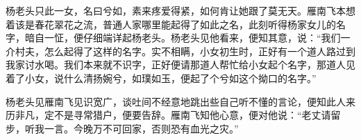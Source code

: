 杨老头只此一女，名曰兮如，素来疼爱得紧，如何肯让她跟了莫无天。雁南飞本想着该是春花翠花之流，普通人家哪里能起得了如此之名，此刻听得杨家女儿的名字，暗自一怔，便仔细端详起杨老头。杨老头见他看来，便知其意，说：“我们一介村夫，怎么起得了这样的名字。实不相瞒，小女初生时，正好有一个道人路过到我家讨水喝。我们本来就不识字，正好便请那道人帮忙给小女起个名字，那道人见着了小女，说什么清扬婉兮，如璞如玉，便起了个兮如这个拗口的名字。”

杨老头见雁南飞见识宽广，谈吐间不经意地跳出些自己听不懂的言论，便知此人来历非凡，定不是寻常猎户，便要告辞。雁南飞知他心意，便对他说：“老丈请留步，听我一言。今晚万不可回家，否则恐有血光之灾。”











